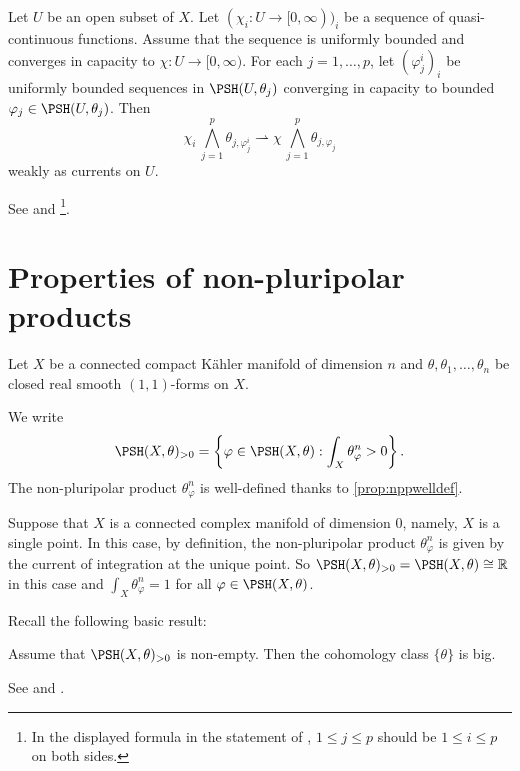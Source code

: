 \begin{theorem}\label{thm:loc_conv_cap}
    Let $U$ be an open subset of $X$. Let $(\chi_i\colon U\rightarrow [0,\infty))_i$ be a sequence of quasi-continuous functions. Assume that the sequence is uniformly bounded and converges in capacity to $\chi\colon U\rightarrow [0,\infty)$. For each $j=1,\ldots,p$, let $(\varphi_j^i)_i$ be uniformly bounded sequences in $\PSH(U,\theta_j)$ converging in capacity to bounded $\varphi_j\in \PSH(U,\theta_j)$. Then
    \[
        \chi_i\,\bigwedge_{j=1}^p \theta_{j,\varphi_j^i}\rightharpoonup  \chi\,\bigwedge_{j=1}^p \theta_{j,\varphi_j}
    \]
    weakly as currents on $U$.
\end{theorem}
See \cite[Theorem~4.26]{GZ17} and \cite[Theorem~9.4.8]{FPT}\footnote{In the displayed formula in the statement of \cite[Theorem~4.26]{GZ17}, $1\leq j\leq p$ should be $1\leq i\leq p$ on both sides.}.

\section{Properties of non-pluripolar products}\label{sec:nppprop}
Let $X$ be a connected compact Kähler manifold of dimension $n$ and $\theta,\theta_1,\ldots,\theta_n$ be closed real smooth $(1,1)$-forms on $X$.

We write
\begin{equation}\label{eq:PSHpos}
\PSH(X,\theta)_{>0}=\left\{ \varphi\in \PSH(X,\theta): \int_X\theta_{\varphi}^n>0 \right\}.
\end{equation}
The non-pluripolar product $\theta_{\varphi}^n$ is well-defined thanks to \cref{prop:nppwelldef}.

\begin{remark}\label{rmk:npp:L275}
    Suppose that $X$ is a connected complex manifold of dimension $0$, namely, $X$ is a single point. In this case, by definition, the non-pluripolar product $\theta_{\varphi}^n$ is given by the current of integration at the unique point. So $\PSH(X,\theta)_{>0}=\PSH(X,\theta)\cong \mathbb{R}$ in this case and $\int_X \theta_{\varphi}^n=1$ for all $\varphi\in \PSH(X,\theta)$.
\end{remark}

Recall the following basic result:
\begin{proposition}\label{prop:nppposimpbig}
    Assume that $\PSH(X,\theta)_{>0}$ is non-empty. Then the cohomology class $\{\theta\}$ is big.
\end{proposition}
See \cite[Proposition~1.22]{BEGZ10} and \cite[Theorem~17.4.20]{FPT}.


